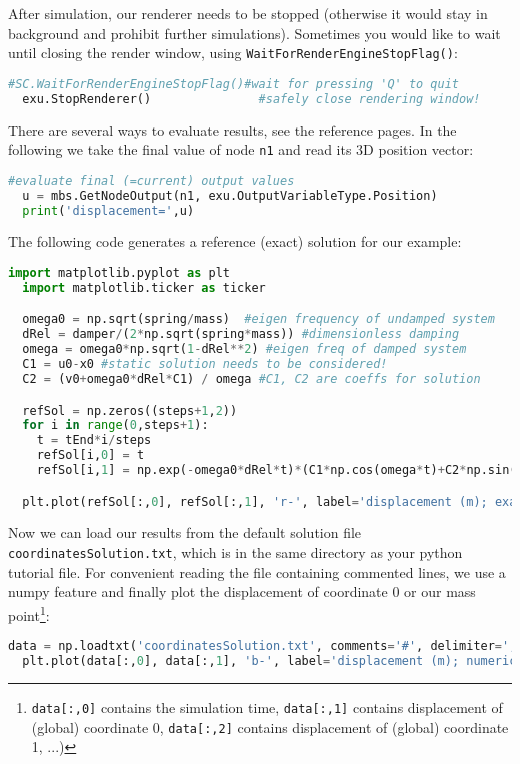 After simulation, our renderer needs to be stopped (otherwise it would stay in background and prohibit further simulations). 
Sometimes you would like to wait until closing the render window, using \texttt{WaitForRenderEngineStopFlag()}:
\begin{lstlisting}[language=Python, firstnumber=49]
  #SC.WaitForRenderEngineStopFlag()#wait for pressing 'Q' to quit
  exu.StopRenderer()               #safely close rendering window!
\end{lstlisting}
%
There are several ways to evaluate results, see the reference pages. In the following we take the final value of node \texttt{n1} and read its 3D position vector:
\begin{lstlisting}[language=Python, firstnumber=51]
  #evaluate final (=current) output values
  u = mbs.GetNodeOutput(n1, exu.OutputVariableType.Position)
  print('displacement=',u)
\end{lstlisting}
%
The following code generates a reference (exact) solution for our example:
\begin{lstlisting}[language=Python, firstnumber=54]
  import matplotlib.pyplot as plt
  import matplotlib.ticker as ticker

  omega0 = np.sqrt(spring/mass)  #eigen frequency of undamped system
  dRel = damper/(2*np.sqrt(spring*mass)) #dimensionless damping
  omega = omega0*np.sqrt(1-dRel**2) #eigen freq of damped system
  C1 = u0-x0 #static solution needs to be considered!
  C2 = (v0+omega0*dRel*C1) / omega #C1, C2 are coeffs for solution

  refSol = np.zeros((steps+1,2))
  for i in range(0,steps+1):
    t = tEnd*i/steps
    refSol[i,0] = t
    refSol[i,1] = np.exp(-omega0*dRel*t)*(C1*np.cos(omega*t)+C2*np.sin(omega*t))+x0

  plt.plot(refSol[:,0], refSol[:,1], 'r-', label='displacement (m); exact solution')
\end{lstlisting}
%
Now we can load our results from the default solution file \texttt{coordinatesSolution.txt}, which is in the same
directory as your python tutorial file. For convenient reading the file containing commented lines, we use a numpy feature and
finally plot the displacement of coordinate 0 or our mass point\footnote{\texttt{data[:,0]} contains the simulation time, \texttt{data[:,1]} contains displacement of (global) coordinate 0, \texttt{data[:,2]} contains displacement of (global) coordinate 1, ...)}:
\begin{lstlisting}[language=Python, firstnumber=73]
  data = np.loadtxt('coordinatesSolution.txt', comments='#', delimiter=',')
  plt.plot(data[:,0], data[:,1], 'b-', label='displacement (m); numerical solution') 
\end{lstlisting}
